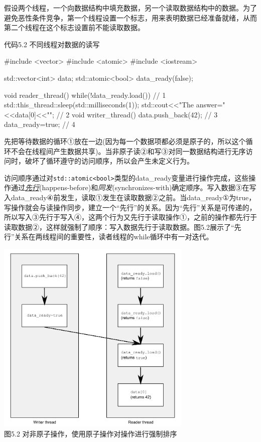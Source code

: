 
假设两个线程，一个向数据结构中填充数据，另一个读取数据结构中的数据。为了避免恶性条件竞争，第一个线程设置一个标志，用来表明数据已经准备就绪，从而第二个线程在这个标志设置前不能读取数据。

代码5.2 不同线程对数据的读写

\begin{cpp}
#include <vector>
#include <atomic>
#include <iostream>

std::vector<int> data;
std::atomic<bool> data_ready(false);

void reader_thread()
{
  while(!data_ready.load())  // 1
  {
    std::this_thread::sleep(std::milliseconds(1));
  }
  std::cout<<"The answer="<<data[0]<<"\m";  // 2
}
void writer_thread()
{
  data.push_back(42);  // 3
  data_ready=true;  // 4
}
\end{cpp}

先把等待数据的循环①放在一边(因为每一个数据项都必须是原子的，所以这个循环不会在线程间产生数据共享)。当非原子读②和写③对同一数据结构进行无序访问时，破坏了循环遵守的访问顺序，所以会产生未定义行为。

访问顺序通过对\texttt{std::atomic<bool>}类型的data\_ready变量进行操作完成，这些操作通过\textit{\href{http://en.wikipedia.org/wiki/Happened-before}{先行}}(happens-before)和\textit{同发}(synchronizes-with)确定顺序。写入数据③在写入data\_ready④前发生，读取①发生在读取数据②之前。当data\_ready①为true，写操作就会与读操作同步，建立一个“先行”的关系。因为“先行”关系是可传递的，所以写入③先行于写入④，这两个行为又先行于读取操作①，之前的操作都先行于读取数据②，这样就强制了顺序：写入数据先行于读取数据。图5.2展示了“先行”关系在两线程间的重要性，读者线程的while循环中有一对迭代。

\begin{center}
    \includegraphics[width=0.7\textwidth]{content/chapter05/images/5-2.png}\\
    图5.2 对非原子操作，使用原子操作对操作进行强制排序
\end{center}

